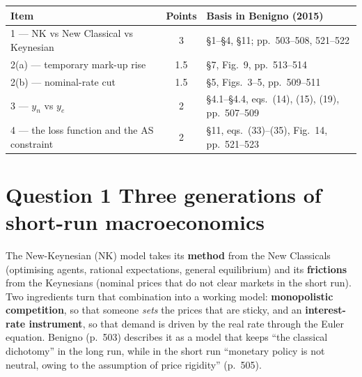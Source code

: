 \documentclass[11pt, a4paper]{article}
\begin{document}
\begin{center}
\small
\begin{tabular}{@{}lcl@{}}
\toprule
\textbf{Item} & \textbf{Points} & \textbf{Basis in Benigno (2015)} \\
\midrule
1 --- NK vs New Classical vs Keynesian & 3 & \S1--\S4, \S11; pp.\ 503--508, 521--522 \\
2(a) --- temporary mark-up rise & 1.5 & \S7, Fig.\ 9, pp.\ 513--514 \\
2(b) --- nominal-rate cut & 1.5 & \S5, Figs.\ 3--5, pp.\ 509--511 \\
3 --- $y_n$ vs $y_e$ & 2 & \S4.1--\S4.4, eqs.\ (14), (15), (19), pp.\ 507--509 \\
4 --- the loss function and the AS constraint & 2 & \S11, eqs.\ (33)--(35), Fig.\ 14, pp.\ 521--523 \\
\bottomrule
\end{tabular}
\end{center}

\section{Question 1 \quad Three generations of short-run macroeconomics}

\begin{tcolorbox}[planbox, title={The one-sentence answer, before the table}]
\small
The New-Keynesian (NK) model takes its \textbf{method} from the New Classicals (optimising
agents, rational expectations, general equilibrium) and its \textbf{frictions} from the
Keynesians (nominal prices that do not clear markets in the short run). Two ingredients
turn that combination into a working model: \textbf{monopolistic competition}, so that
someone \emph{sets} the prices that are sticky, and an \textbf{interest-rate instrument},
so that demand is driven by the real rate through the Euler equation. Benigno (p.~503)
describes it as a model that keeps ``the classical dichotomy'' in the long run, while in
the short run ``monetary policy is not neutral, owing to the assumption of price
rigidity'' (p.~505).
\end{tcolorbox}
\end{document}
